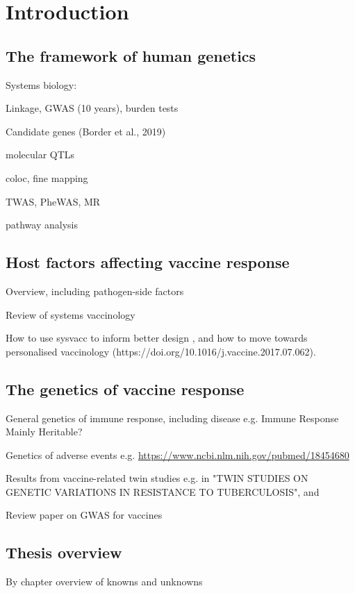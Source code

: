 %
%

\chapter{Introduction}

\section{The framework of human genetics}

Systems biology:

Linkage, GWAS (10 years), burden tests

Candidate genes (Border et al., 2019)

molecular QTLs

coloc, fine mapping

TWAS, PheWAS\autocite{vermaCurrentScopeChallenges2017}, MR

pathway analysis

\section{Host factors affecting vaccine response}

Overview, including pathogen-side factors

Review of systems vaccinology

How to use sysvacc to inform better design \autocite{Mooney2013a}, and how to move towards personalised vaccinology (https://doi.org/10.1016/j.vaccine.2017.07.062).

\section{The genetics of vaccine response}

General genetics of immune response, including disease e.g. Immune Response Mainly Heritable? 

Genetics of adverse events e.g. \url{https://www.ncbi.nlm.nih.gov/pubmed/18454680}

Results from vaccine-related twin studies e.g. in "TWIN STUDIES ON GENETIC VARIATIONS IN RESISTANCE TO TUBERCULOSIS", and \autocite{Qi2016} 

Review paper on GWAS for vaccines \autocite{Mooney2013}

\section{Thesis overview}

By chapter overview of knowns and unknowns


